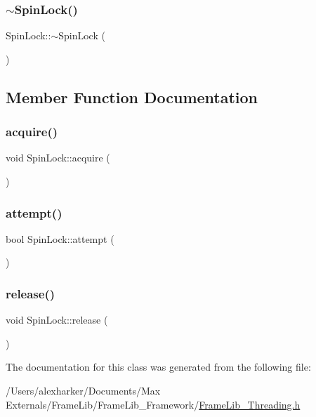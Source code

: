 \subsubsection{\texorpdfstring{$\sim$\+Spin\+Lock()}{~SpinLock()}}
{\footnotesize\ttfamily Spin\+Lock\+::$\sim$\+Spin\+Lock (\begin{DoxyParamCaption}{ }\end{DoxyParamCaption})\hspace{0.3cm}{\ttfamily [inline]}}



\subsection{Member Function Documentation}
\mbox{\label{class_spin_lock_ae35cf9e034be7ddced1fcfaefb0161ca}} 
\subsubsection{\texorpdfstring{acquire()}{acquire()}}
{\footnotesize\ttfamily void Spin\+Lock\+::acquire (\begin{DoxyParamCaption}{ }\end{DoxyParamCaption})\hspace{0.3cm}{\ttfamily [inline]}}

\mbox{\label{class_spin_lock_a5c9211c6e3323218948c48e22623836f}} 
\subsubsection{\texorpdfstring{attempt()}{attempt()}}
{\footnotesize\ttfamily bool Spin\+Lock\+::attempt (\begin{DoxyParamCaption}{ }\end{DoxyParamCaption})\hspace{0.3cm}{\ttfamily [inline]}}

\mbox{\label{class_spin_lock_a7915866117b47f7e1e881a6363c943dd}} 
\subsubsection{\texorpdfstring{release()}{release()}}
{\footnotesize\ttfamily void Spin\+Lock\+::release (\begin{DoxyParamCaption}{ }\end{DoxyParamCaption})\hspace{0.3cm}{\ttfamily [inline]}}



The documentation for this class was generated from the following file\+:\begin{DoxyCompactItemize}
\item 
/\+Users/alexharker/\+Documents/\+Max Externals/\+Frame\+Lib/\+Frame\+Lib\+\_\+\+Framework/\hyperlink{_frame_lib___threading_8h}{Frame\+Lib\+\_\+\+Threading.\+h}\end{DoxyCompactItemize}
